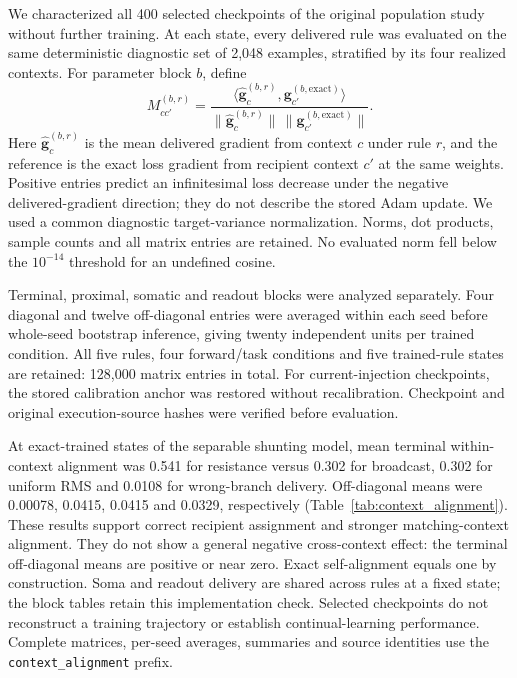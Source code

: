 We characterized all 400 selected checkpoints of the original population
study without further training. At each state, every delivered rule was
evaluated on the same deterministic diagnostic set of 2,048 examples,
stratified by its four realized contexts. For parameter block $b$, define
\[
M_{cc'}^{(b,r)}=
\frac{\langle\widehat{\bm g}_{c}^{(b,r)},\bm g_{c'}^{(b,\mathrm{exact})}\rangle}
{\|\widehat{\bm g}_{c}^{(b,r)}\|\,\|\bm g_{c'}^{(b,\mathrm{exact})}\|}.
\]
Here $\widehat{\bm g}_{c}^{(b,r)}$ is the mean delivered gradient from
context $c$ under rule $r$, and the reference is the exact loss gradient
from recipient context $c'$ at the same weights. Positive entries predict
an infinitesimal loss decrease under the negative delivered-gradient
direction; they do not describe the stored Adam update. We used a common
diagnostic target-variance normalization. Norms, dot products, sample counts
and all matrix entries are retained. No evaluated norm fell below the
$10^{-14}$ threshold for an undefined cosine.

Terminal, proximal, somatic and readout blocks were analyzed separately.
Four diagonal and twelve off-diagonal entries were averaged within each
seed before whole-seed bootstrap inference, giving twenty independent
units per trained condition. All five rules, four forward/task conditions
and five trained-rule states are retained: 128,000 matrix entries in total.
For current-injection checkpoints, the stored calibration anchor was
restored without recalibration. Checkpoint and original execution-source
hashes were verified before evaluation.

At exact-trained states of the separable shunting model, mean terminal
within-context alignment was 0.541 for resistance versus 0.302 for
broadcast, 0.302 for uniform RMS and 0.0108 for wrong-branch delivery.
Off-diagonal means were 0.00078, 0.0415, 0.0415 and 0.0329, respectively
(Table~\ref{tab:context_alignment}). These results support correct recipient
assignment and stronger matching-context alignment. They do not show a
general negative cross-context effect: the terminal off-diagonal means
are positive or near zero. Exact self-alignment equals one by construction.
Soma and readout delivery are shared across rules at a fixed state; the
block tables retain this implementation check. Selected checkpoints do not
reconstruct a training trajectory or establish continual-learning
performance. Complete matrices, per-seed averages, summaries and source
identities use the \texttt{context\_alignment} prefix.
